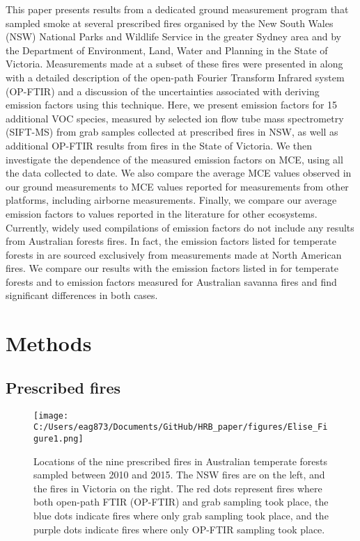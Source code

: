 \documentclass[acp, manuscript]{copernicus}
\begin{document}
This paper presents results from a dedicated ground measurement program that sampled smoke at several prescribed fires organised by the New South Wales (NSW) National Parks and Wildlife Service in the greater Sydney area and by the Department of Environment, Land, Water and Planning %
in the State of Victoria. Measurements made at a subset of these fires were presented in \citet{Paton-Walsh2014} along with a detailed description of the open-path Fourier Transform Infrared system (OP-FTIR) and a discussion of the uncertainties associated with deriving emission factors using this technique.
Here, we present emission factors for 15 additional VOC species, measured by selected ion flow tube mass spectrometry (SIFT-MS) from grab samples collected at prescribed fires in NSW, as well as additional OP-FTIR results from fires in the State of Victoria.
We then investigate the dependence of the measured emission factors on MCE, using all the data collected to date. We also compare the average MCE values observed in our ground measurements to MCE values reported for measurements from other platforms, including airborne measurements. Finally, we compare our average emission factors to values reported in the literature for other ecosystems. Currently, widely used compilations of emission factors \citep[e.g.,][]{Akagi2011} do not include any results from Australian forests fires. In fact, the emission factors listed for temperate forests in \citet{Akagi2011} are sourced exclusively from measurements made at North American fires. We compare our results with the emission factors listed in \citet[Table S4, February 2015 update]{Akagi2011} for temperate forests and to emission factors measured for Australian savanna fires and find significant differences in both cases. %

\section{Methods}
\subsection{Prescribed fires}


\begin{figure}
  \texttt{[image: C:/Users/eag873/Documents/GitHub/HRB\_paper/figures/Elise\_Figure1.png]}
  \caption{Locations of the nine prescribed fires in Australian temperate forests sampled between 2010 and 2015. The NSW fires are on the left, and the fires in Victoria on the right. The red dots represent fires where both open-path FTIR (OP-FTIR) and grab sampling took place, the blue dots indicate fires where only grab sampling took place, and the purple dots indicate fires where only OP-FTIR sampling took place.}
  \label{fig:map}
\end{figure}
\end{document}
